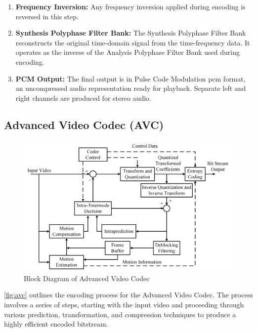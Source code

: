 \begin{enumerate}[label=\textbf{\roman*.}]
            \item \textbf{Frequency Inversion:}  
            Any frequency inversion applied during encoding is reversed in this step.
        
            \item \textbf{Synthesis Polyphase Filter Bank:}  
            The Synthesis Polyphase Filter Bank reconstructs the original time-domain signal from the time-frequency data. It operates as the inverse of the Analysis Polyphase Filter Bank used during encoding.
        
            \item \textbf{PCM Output:}  
            The final output is in Pulse Code Modulation \gls{pcm} format, an uncompressed audio representation ready for playback. Separate left and right channels are produced for stereo audio.
        \end{enumerate}
        
    \subsection{Advanced Video Codec (AVC) }
        \begin{figure}[H]
        \centering
        \includegraphics[width=0.95\linewidth]{assets/h264_blockdiagram.png}
        \caption{Block Diagram of Advanced Video Codec}
        \label{fig:avc}
    \end{figure}

    \autoref{fig:avc} outlines the encoding process for the Advanced Video Codec. The process involves a series of steps, starting with the input video and proceeding through various prediction, transformation, and compression techniques to produce a highly efficient encoded bitstream. 

